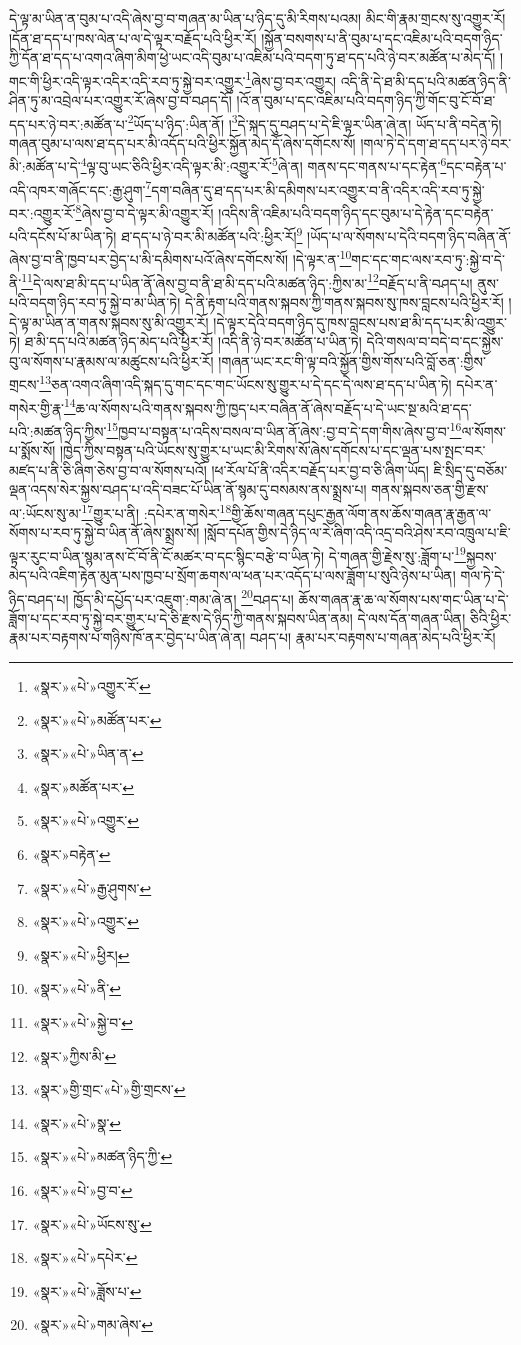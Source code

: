 དེ་ལྟ་མ་ཡིན་ན་བུམ་པ་འདི་ཞེས་བྱ་བ་གཞན་མ་ཡིན་པ་ཉིད་དུ་མི་རིགས་པའམ། མིང་གི་རྣམ་གྲངས་སུ་འགྱུར་རོ། །དོན་ཐ་དད་པ་ཁས་ལེན་པ་ལ་དེ་ལྟར་བརྗོད་པའི་ཕྱིར་རོ། །སྐྱོན་བསགས་པ་ནི་བུམ་པ་དང་འཇིམ་པའི་བདག་ཉིད་ཀྱི་དོན་ཐ་དད་པ་འགའ་ཞིག་མིག་ཕྱེ་ཡང་འདི་བུམ་པ་འཇིམ་པའི་བདག་ཏུ་ཐ་དད་པའི་ཉེ་བར་མཚོན་པ་མེད་དོ། །གང་གི་ཕྱིར་འདི་ལྟར་འདིར་འདི་རབ་ཏུ་སྐྱེ་བར་འགྱུར་\footnote{«སྣར་»«པེ་»འགྱུར་རོ་}ཞེས་བྱ་བར་འགྱུར། འདི་ནི་དེ་ཐ་མི་དད་པའི་མཚན་ཉིད་ནི་ཤིན་ཏུ་མ་འབྲེལ་པར་འགྱུར་རོ་ཞེས་བྱ་བ་བཤད་དོ། །འོ་ན་བུམ་པ་དང་འཇིམ་པའི་བདག་ཉིད་ཀྱི་གོང་བུ་ངོ་བོ་ཐ་དད་པར་ཉེ་བར་:མཚོན་པ་\footnote{«སྣར་»«པེ་»མཚོན་པར་}ཡོད་པ་ཉིད་:ཡིན་ནོ། །\footnote{«སྣར་»«པེ་»ཡིན་ན་}དེ་སྐད་དུ་བཤད་པ་དེ་ཇི་ལྟར་ཡིན་ཞེ་ན། ཡོད་པ་ནི་བདེན་ཏེ། གཞན་བུམ་པ་ལས་ཐ་དད་པར་མི་འདོད་པའི་ཕྱིར་སྐྱོན་མེད་དོ་ཞེས་དགོངས་སོ། །གལ་ཏེ་དེ་དག་ཐ་དད་པར་ཉེ་བར་མི་:མཚོན་པ་དེ་\footnote{«སྣར་»མཚོན་པར་}ལྟ་བུ་ཡང་ཅིའི་ཕྱིར་འདི་ལྟར་མི་:འགྱུར་རོ་\footnote{«སྣར་»«པེ་»འགྱུར་}ཞེ་ན། གནས་དང་གནས་པ་དང་རྟེན་\footnote{«སྣར་»བརྟེན་}དང་བརྟེན་པ་འདི་འཁར་གཞོང་དང་:རྒྱ་ཤུག་\footnote{«སྣར་»«པེ་»རྒྱ་ཤུགས་}དག་བཞིན་དུ་ཐ་དད་པར་མི་དམིགས་པར་འགྱུར་བ་ནི་འདིར་འདི་རབ་ཏུ་སྐྱེ་བར་:འགྱུར་རོ་\footnote{«སྣར་»«པེ་»འགྱུར་}ཞེས་བྱ་བ་དེ་ལྟར་མི་འགྱུར་རོ། །འདིས་ནི་འཇིམ་པའི་བདག་ཉིད་དང་བུམ་པ་དེ་རྟེན་དང་བརྟེན་པའི་དངོས་པོ་མ་ཡིན་ཏེ། ཐ་དད་པ་ཉེ་བར་མི་མཚོན་པའི་:ཕྱིར་རོ།\footnote{«སྣར་»«པེ་»ཕྱིར།} །ཡོད་པ་ལ་སོགས་པ་དེའི་བདག་ཉིད་བཞིན་ནོ་ཞེས་བྱ་བ་ནི་ཁྱབ་པར་བྱེད་པ་མི་དམིགས་པའོ་ཞེས་དགོངས་སོ། །དེ་ལྟར་ན་\footnote{«སྣར་»«པེ་»ནི་}གང་དང་གང་ལས་རབ་ཏུ་:སྐྱེ་བ་དེ་ནི་\footnote{«སྣར་»«པེ་»སྐྱེ་བ་}དེ་ལས་ཐ་མི་དད་པ་ཡིན་ནོ་ཞེས་བྱ་བ་ནི་ཐ་མི་དད་པའི་མཚན་ཉིད་:ཀྱིས་མ་\footnote{«སྣར་»ཀྱིས་མི་}བརྗོད་པ་ནི་བཤད་པ། ནུས་པའི་བདག་ཉིད་རབ་ཏུ་སྐྱེ་བ་མ་ཡིན་ཏེ། དེ་ནི་རྟག་པའི་གནས་སྐབས་ཀྱི་གནས་སྐབས་སུ་ཁས་བླངས་པའི་ཕྱིར་རོ། །དེ་ལྟ་མ་ཡིན་ན་གནས་སྐབས་སུ་མི་འགྱུར་རོ། །དེ་ལྟར་དེའི་བདག་ཉིད་དུ་ཁས་བླངས་པས་ཐ་མི་དད་པར་མི་འགྱུར་ཏེ། ཐ་མི་དད་པའི་མཚན་ཉིད་མེད་པའི་ཕྱིར་རོ། །འདི་ནི་ཉེ་བར་མཚོན་པ་ཡིན་ཏེ། དེའི་གསལ་བ་བདེ་བ་དང་སྐྱེས་བུ་ལ་སོགས་པ་རྣམས་ལ་མཚུངས་པའི་ཕྱིར་རོ། །གཞན་ཡང་རང་གི་ལྟ་བའི་སྐྱོན་གྱིས་གོས་པའི་བློ་ཅན་:གྱིས་གྲངས་\footnote{«སྣར་»གྱི་གྲང་«པེ་»གྱི་གྲངས་}ཅན་འགའ་ཞིག་འདི་སྐད་དུ་གང་དང་གང་ཡོངས་སུ་གྱུར་པ་དེ་དང་དེ་ལས་ཐ་དད་པ་ཡིན་ཏེ། དཔེར་ན་གསེར་གྱི་རྣ་\footnote{«སྣར་»«པེ་»སྣ་}ཆ་ལ་སོགས་པའི་གནས་སྐབས་ཀྱི་ཁྱད་པར་བཞིན་ནོ་ཞེས་བརྗོད་པ་དེ་ཡང་སྔ་མའི་ཐ་དད་པའི་:མཚན་ཉིད་ཀྱིས་\footnote{«སྣར་»«པེ་»མཚན་ཉིད་ཀྱི་}ཁྱབ་པ་བསྟན་པ་འདིས་བསལ་བ་ཡིན་ནོ་ཞེས་:བྱ་བ་དེ་དག་གིས་ཞེས་བྱ་བ་\footnote{«སྣར་»«པེ་»བྱ་བ་}ལ་སོགས་པ་སྨོས་སོ། །ཁྱེད་ཀྱིས་བསྟན་པའི་ཡོངས་སུ་གྱུར་པ་ཡང་མི་རིགས་སོ་ཞེས་དགོངས་པ་དང་ལྡན་པས་སྤང་བར་མཛད་པ་ནི་ཅི་ཞིག་ཅེས་བྱ་བ་ལ་སོགས་པའོ། །ཕ་རོལ་པོ་ནི་འདིར་བརྗོད་པར་བྱ་བ་ཅི་ཞིག་ཡོད། ཇི་སྲིད་དུ་བཅོམ་ལྡན་འདས་སེར་སྐྱས་བཤད་པ་འདི་བཟང་པོ་ཡིན་ནོ་སྙམ་དུ་བསམས་ནས་སྨྲས་པ། གནས་སྐབས་ཅན་གྱི་རྫས་ལ་:ཡོངས་སུ་མ་\footnote{«སྣར་»«པེ་»ཡོངས་སུ་}གྱུར་པ་ནི། :དཔེར་ན་གསེར་\footnote{«སྣར་»«པེ་»དཔེར་}གྱི་ཆོས་གཞན་དཔུང་རྒྱན་ལོག་ནས་ཆོས་གཞན་རྣ་རྒྱན་ལ་སོགས་པ་རབ་ཏུ་སྐྱེ་བ་ཡིན་ནོ་ཞེས་སྨྲས་སོ། །སློབ་དཔོན་གྱིས་དེ་ཉིད་ལ་རེ་ཞིག་འདི་འདྲ་བའི་ཤེས་རབ་འཁྲུལ་པ་ཇི་ལྟར་རུང་བ་ཡིན་སྙམ་ནས་ངོ་བོ་ནི་ངོ་མཚར་བ་དང་སྙིང་བརྩེ་བ་ཡིན་ཏེ། དེ་གཞན་གྱི་རྗེས་སུ་:ཟློག་པ་\footnote{«སྣར་»«པེ་»ཟློས་པ་}སྐྱབས་མེད་པའི་འཇིག་རྟེན་མུན་པས་ཁྱབ་པ་སྲོག་ཆགས་ལ་ཕན་པར་འདོད་པ་ལས་ཟློག་པ་སུའི་ཉེས་པ་ཡིན། གལ་ཏེ་དེ་ཉིད་བཤད་པ། ཁྱོད་མི་དཔྱོད་པར་འཇུག་:གམ་ཞེ་ན། \footnote{«སྣར་»«པེ་»གམ་ཞེས་}བཤད་པ། ཆོས་གཞན་རྣ་ཆ་ལ་སོགས་པས་གང་ཡིན་པ་དེ་ཟློག་པ་དང་རབ་ཏུ་སྐྱེ་བར་གྱུར་པ་དེ་ཅི་རྫས་དེ་ཉིད་ཀྱི་གནས་སྐབས་ཡིན་ནམ། དེ་ལས་དོན་གཞན་ཡིན། ཅིའི་ཕྱིར་རྣམ་པར་བརྟགས་པ་གཉིས་ཁོ་ནར་བྱེད་པ་ཡིན་ཞེ་ན། བཤད་པ། རྣམ་པར་བརྟགས་པ་གཞན་མེད་པའི་ཕྱིར་རོ། 